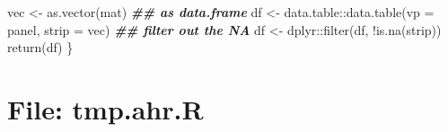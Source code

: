\documentclass[
]{article}
\newenvironment{Shaded}{\begin{snugshade}}{\end{snugshade}}
\newcommand{\AttributeTok}[1]{\textcolor[rgb]{0.77,0.63,0.00}{#1}}
\newcommand{\DocumentationTok}[1]{\textcolor[rgb]{0.56,0.35,0.01}{\textbf{\textit{#1}}}}
\newcommand{\FunctionTok}[1]{\textcolor[rgb]{0.00,0.00,0.00}{#1}}
\newcommand{\NormalTok}[1]{#1}
\newcommand{\OtherTok}[1]{\textcolor[rgb]{0.56,0.35,0.01}{#1}}
\newcommand{\SpecialCharTok}[1]{\textcolor[rgb]{0.00,0.00,0.00}{#1}}
\begin{document}
\begin{Shaded}
\begin{Highlighting}[]
\NormalTok{    vec }\OtherTok{\textless{}{-}} \FunctionTok{as.vector}\NormalTok{(mat)}
    \DocumentationTok{\#\# as data.frame}
\NormalTok{    df }\OtherTok{\textless{}{-}}\NormalTok{ data.table}\SpecialCharTok{::}\FunctionTok{data.table}\NormalTok{(}\AttributeTok{vp =}\NormalTok{ panel, }\AttributeTok{strip =}\NormalTok{ vec)}
    \DocumentationTok{\#\# filter out the NA}
\NormalTok{    df }\OtherTok{\textless{}{-}}\NormalTok{ dplyr}\SpecialCharTok{::}\FunctionTok{filter}\NormalTok{(df, }\SpecialCharTok{!}\FunctionTok{is.na}\NormalTok{(strip))}
    \FunctionTok{return}\NormalTok{(df)}
\NormalTok{  \}}
\end{Highlighting}
\end{Shaded}

\hypertarget{file-tmp.ahr.r}{%
\section{File: tmp.ahr.R}\label{file-tmp.ahr.r}}
\end{document}
